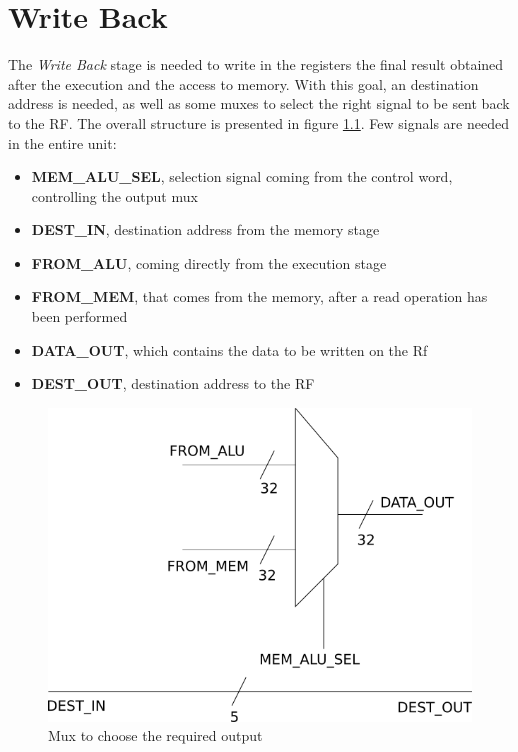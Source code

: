 \chapter{Write Back}
\label{chap_wb}


The \textit{Write Back} stage is needed to write in the registers the final result obtained after the execution and the access to memory. With this goal, an destination address is needed, as well as some muxes to select the right signal to be sent back to the \textsf{RF}. The overall structure is presented in figure \ref{wb_overall_fig}.
Few signals are needed in the entire unit:
\begin{itemize}
	\item \textbf{MEM\_ALU\_SEL}, selection signal coming from the control word, controlling the output mux
	\item \textbf{DEST\_IN}, destination address from the memory stage
	\item \textbf{FROM\_ALU}, coming directly from the execution stage
	\item \textbf{FROM\_MEM}, that comes from the memory, after a read operation has been performed
	\item \textbf{DATA\_OUT}, which contains the data to be written on the \textsf{Rf}
	\item \textbf{DEST\_OUT}, destination address to the \textsf{RF}
\end{itemize}

\begin{figure}
	\centering
	\includegraphics[scale=0.5]{chapters/figures/wb_stage}
	\caption{Mux to choose the required output}
	\label{wb_overall_fig}
\end{figure} 

